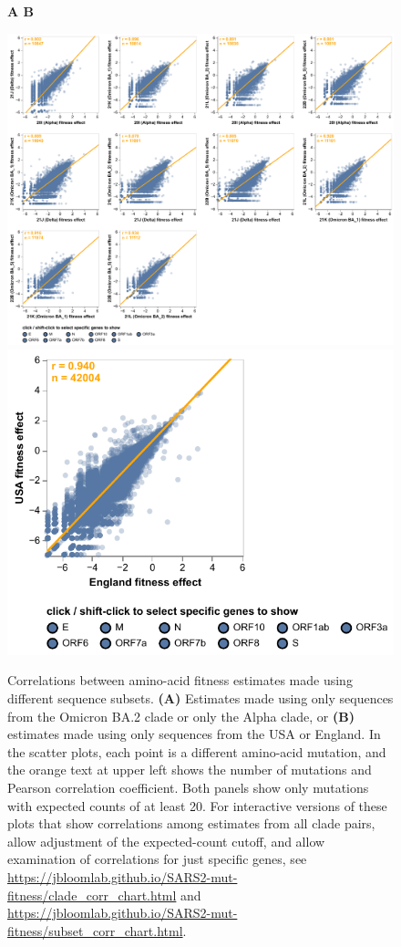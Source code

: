 \documentclass[9pt,twocolumn,twoside]{gsajnl_modified}
\begin{document}
\begin{figure}
\centering
{\bf \Large A \hspace{0.32\linewidth} B \hspace{0.32\linewidth}} 

\includegraphics[width=0.32\linewidth]{figs/clade_corr_chart.pdf}
\hspace{0.05\linewidth}
\includegraphics[width=0.32\linewidth]{figs/subset_corr_chart.pdf}
\caption{
Correlations between amino-acid fitness estimates made using different sequence subsets.
{\bf (A)} Estimates made using only sequences from the Omicron BA.2 clade or only the Alpha clade, or {\bf (B)} estimates made using only sequences from the USA or England.
In the scatter plots, each point is a different amino-acid mutation, and the orange text at upper left shows the number of mutations and Pearson correlation coefficient.
Both panels show only mutations with expected counts of at least 20.
For interactive versions of these plots that show correlations among estimates from all clade pairs, allow adjustment of the expected-count cutoff, and allow examination of correlations for just specific genes, see \url{https://jbloomlab.github.io/SARS2-mut-fitness/clade_corr_chart.html} and \url{https://jbloomlab.github.io/SARS2-mut-fitness/subset_corr_chart.html}.
\label{fig:corr}
}
\end{figure}
\end{document}

